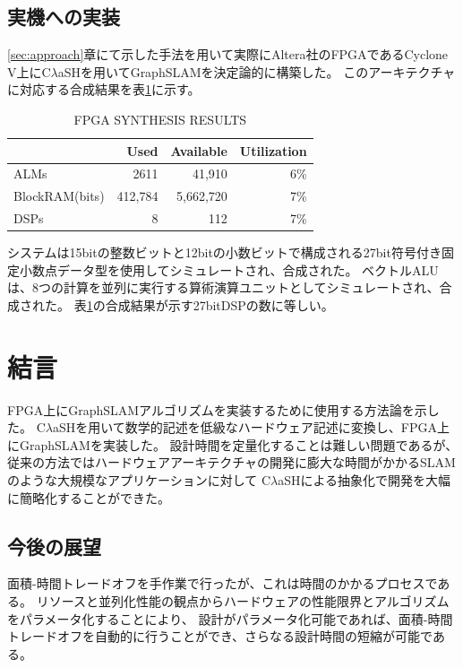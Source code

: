 \documentclass{jsarticle}
\begin{document}
\subsection{実機への実装}
\ref{sec:approach}章にて示した手法を用いて実際にAltera社のFPGAであるCyclone V上にC$\lambda$aSHを用いてGraphSLAMを決定論的に構築した。
このアーキテクチャに対応する合成結果を表\ref{tab:fpga-results}に示す。
\begin{table}[H]
\caption{FPGA SYNTHESIS RESULTS}
\begin{tabular}{|l|r|r|r|}
\hline
               & Used    & Available & Utilization \\ \hline
ALMs           & 2611    & 41,910    & 6\%         \\
BlockRAM(bits) & 412,784 & 5,662,720 & 7\%         \\
DSPs           & 8       & 112       & 7\%         \\ \hline
\end{tabular}
\label{tab:fpga-results}
\end{table}
システムは15bitの整数ビットと12bitの小数ビットで構成される27bit符号付き固定小数点データ型を使用してシミュレートされ、合成された。
ベクトルALUは、8つの計算を並列に実行する算術演算ユニットとしてシミュレートされ、合成された。
表\ref{tab:fpga-results}の合成結果が示す27bitDSPの数に等しい。


\section{結言}
FPGA上にGraphSLAMアルゴリズムを実装するために使用する方法論を示した。
C$\lambda$aSHを用いて数学的記述を低級なハードウェア記述に変換し、FPGA上にGraphSLAMを実装した。
設計時間を定量化することは難しい問題であるが、
従来の方法ではハードウェアアーキテクチャの開発に膨大な時間がかかるSLAMのような大規模なアプリケーションに対して
C$\lambda$aSHによる抽象化で開発を大幅に簡略化することができた。

\subsection{今後の展望}
面積-時間トレードオフを手作業で行ったが、これは時間のかかるプロセスである。
リソースと並列化性能の観点からハードウェアの性能限界とアルゴリズムをパラメータ化することにより、
設計がパラメータ化可能であれば、面積-時間トレードオフを自動的に行うことができ、さらなる設計時間の短縮が可能である。

\footnotesize



\normalsize
\end{document}
